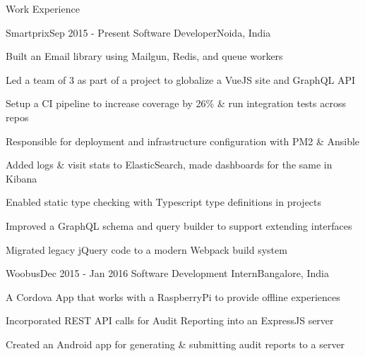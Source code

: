 \documentclass{resume} %
\begin{document}
\begin{rSection}{Work Experience}

    \begin{rSubsection}{Smartprix}{Sep 2015 - Present}
        {Software Developer}{Noida, India}

        \item Built an Email library using Mailgun, Redis, and queue workers
        \item Led a team of 3 as part of a project to globalize a VueJS site and GraphQL API
        \item Setup a CI pipeline to increase coverage by 26\% \& run integration tests across repos
        \item Responsible for deployment and infrastructure configuration with PM2 \& Ansible 
        \item Added logs \& visit stats to ElasticSearch, made dashboards for the same in Kibana
        \item Enabled static type checking with Typescript type definitions in projects
        \item Improved a GraphQL schema and query builder to support extending interfaces
        \item Migrated legacy jQuery code to a modern Webpack build system
    \end{rSubsection}


    \begin{rSubsection}{Woobus}{Dec 2015 - Jan 2016}
        {Software Development Intern}{Bangalore, India}

        \item A Cordova App that works with a RaspberryPi to provide offline experiences
        \item Incorporated REST API calls for Audit Reporting into an ExpressJS server
        \item Created an Android app for generating \& submitting audit reports to a server
    \end{rSubsection}

\end{rSection}


\end{document}
